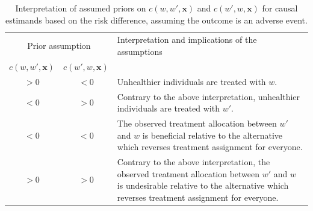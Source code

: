 \begin{table}[H]
\centering
\caption{Interpretation of assumed priors on $c(w, w', \bm{x})$ and $c(w', w, \bm{x})$ for causal estimands based on the risk difference, assuming the outcome is an adverse event.}
\label{tab:cfun-inter}
\begin{tabular}{ccp{}}
\toprule
\multicolumn{2}{c}{Prior assumption}  & Interpretation and implications of the assumptions\\
$c(w, w', \bm{x})$ &$c(w', w, \bm{x})$ &\\\hline
$>0$ &$<0$ & Unhealthier individuals are treated with $w$. \\
$<0$ &$>0$ & Contrary to the above interpretation, unhealthier individuals are treated with $w'$. \\
$<0$ &$<0$ & The observed treatment allocation between $w'$ and $w$ is beneficial relative to the alternative which reverses treatment assignment for everyone. \\
$>0$ &$>0$ & Contrary to the above interpretation, the observed treatment allocation between $w'$ and $w$ is undesirable relative to the alternative which reverses treatment assignment for everyone.\\ 
\bottomrule
\end{tabular}
\end{table}



